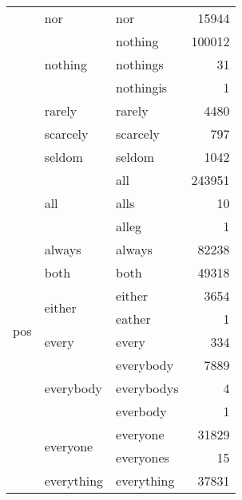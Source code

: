 \begin{longtable}[ht]{lllr}
\cline{2-4}
 & nor & nor & {\cellcolor[HTML]{E7D7F8}} \color[HTML]{000000} 15944 \\
\cline{2-4}
 & \multirow[c]{3}{*}{nothing} & nothing & {\cellcolor[HTML]{EE86EE}} \color[HTML]{000000} 100012 \\
 &  & nothings & {\cellcolor[HTML]{E6E6FA}} \color[HTML]{000000} 31 \\
 &  & nothingis & {\cellcolor[HTML]{E6E6FA}} \color[HTML]{000000} 1 \\
\cline{2-4}
 & rarely & rarely & {\cellcolor[HTML]{E6E2FA}} \color[HTML]{000000} 4480 \\
\cline{2-4}
 & scarcely & scarcely & {\cellcolor[HTML]{E6E6FA}} \color[HTML]{000000} 797 \\
\cline{2-4}
 & seldom & seldom & {\cellcolor[HTML]{E6E6FA}} \color[HTML]{000000} 1042 \\
\cline{1-4} \cline{2-4}
\multirow[c]{35}{*}{pos} & \multirow[c]{3}{*}{all} & all & {\cellcolor[HTML]{6D0081}} \color[HTML]{F1F1F1} 243951 \\
 &  & alls & {\cellcolor[HTML]{E6E6FA}} \color[HTML]{000000} 10 \\
 &  & alleg & {\cellcolor[HTML]{E6E6FA}} \color[HTML]{000000} 1 \\
\cline{2-4}
 & always & always & {\cellcolor[HTML]{EC96F0}} \color[HTML]{000000} 82238 \\
\cline{2-4}
 & both & both & {\cellcolor[HTML]{EAB7F4}} \color[HTML]{000000} 49318 \\
\cline{2-4}
 & \multirow[c]{2}{*}{either} & either & {\cellcolor[HTML]{E6E2FA}} \color[HTML]{000000} 3654 \\
 &  & eather & {\cellcolor[HTML]{E6E6FA}} \color[HTML]{000000} 1 \\
\cline{2-4}
 & every & every & {\cellcolor[HTML]{E6E6FA}} \color[HTML]{000000} 334 \\
\cline{2-4}
 & \multirow[c]{3}{*}{everybody} & everybody & {\cellcolor[HTML]{E7DFF9}} \color[HTML]{000000} 7889 \\
 &  & everybodys & {\cellcolor[HTML]{E6E6FA}} \color[HTML]{000000} 4 \\
 &  & everbody & {\cellcolor[HTML]{E6E6FA}} \color[HTML]{000000} 1 \\
\cline{2-4}
 & \multirow[c]{2}{*}{everyone} & everyone & {\cellcolor[HTML]{E8C7F6}} \color[HTML]{000000} 31829 \\
 &  & everyones & {\cellcolor[HTML]{E6E6FA}} \color[HTML]{000000} 15 \\
\cline{2-4}
 & \multirow[c]{3}{*}{everything} & everything & {\cellcolor[HTML]{E9C2F6}} \color[HTML]{000000} 37831 \\

\end{longtable}
